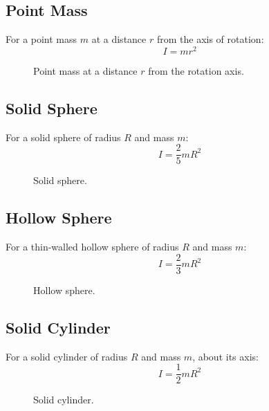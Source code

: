 \documentclass[12pt]{article}
\begin{document}
\subsection{Point Mass}
For a point mass \(m\) at a distance \(r\) from the axis of rotation:
\[
I = mr^2
\]
\begin{figure}[h]
\centering
{}
\caption{Point mass at a distance \(r\) from the rotation axis.}
\end{figure}

\subsection{Solid Sphere}
For a solid sphere of radius \(R\) and mass \(m\):
\[
I = \frac{2}{5} mR^2
\]
\begin{figure}[h]
\centering
{}
\caption{Solid sphere.}
\end{figure}

\subsection{Hollow Sphere}
For a thin-walled hollow sphere of radius \(R\) and mass \(m\):
\[
I = \frac{2}{3} mR^2
\]
\begin{figure}[h]
\centering
{}
\caption{Hollow sphere.}
\end{figure}

\subsection{Solid Cylinder}
For a solid cylinder of radius \(R\) and mass \(m\), about its axis:
\[
I = \frac{1}{2} mR^2
\]
\begin{figure}[h]
\centering
{}
\caption{Solid cylinder.}
\end{figure}
\end{document}
